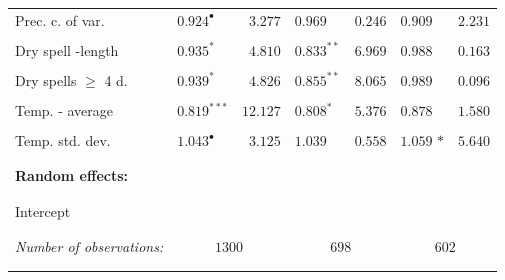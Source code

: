 \documentclass[a4paper,12pt]{article}
\begin{document}
\begin{itemize}
{\begin{threeparttable}
\begin{footnotesize}
\begin{tabular}{llrlllr}
    \\ \vspace{-0.2cm}Prec. c. of var.&$0.924^{\bullet}$&$3.277$&$0.969$ &$0.246$&$0.909^{}$&$2.231$\\
  \\  \vspace{-0.2cm}Dry spell -length&$0.935^{*}$&$4.810$&$0.833^{**}$&$6.969$&$ 0.988^{}$&$0.163$\\
  \\ \vspace{-0.2cm}Dry spells 	$\geq$ 4 d.&$0.939^{*}$&$4.826$&$0.855^{**}$&$8.065$&$0.989^{}$&$0.096$\\
  \\ \vspace{-0.2cm}Temp. - average&$0.819^{***}$&$12.127$&$0.808^{*}$&$5.376$&$0.878$ $^{}$&$1.580$\\
  \\  \vspace{-0.2cm}Temp. std. dev.&$1.043^{\bullet}$&$3.125$&$1.039$&$0.558$&$1.059$ ${*}$&$5.640$\\
  \\
  \hline
\vspace{-0.2cm} \\
  \multicolumn{1}{l}{\textbf{Random effects:}}  & \\
\vspace{-0.2cm}
\\
\hline
\\
  \vspace{-0.2cm}Intercept\\
 \\ 
 \hline
\vspace{-0.2cm} \\
\textit{Number of observations:}  &\multicolumn{2}{c}{$1300$}&\multicolumn{2}{c}{$698$}&\multicolumn{2}{c}{$602$}\\
\vspace{-0.2cm}
\\  
  
  \hline
  \vspace{-0.2cm} \\


\end{tabular}
\end{footnotesize}
\end{threeparttable}}
\end{itemize}
\end{document}
